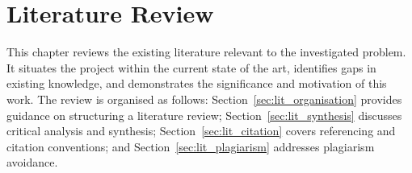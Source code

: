 
\chapter{Literature Review}
\label{ch:lit_rev}

This chapter reviews the existing literature relevant to the investigated problem. 
It situates the project within the current state of the art, identifies gaps in 
existing knowledge, and demonstrates the significance and motivation of this work. 
The review is organised as follows: Section~\ref{sec:lit_organisation} provides 
guidance on structuring a literature review; Section~\ref{sec:lit_synthesis} 
discusses critical analysis and synthesis; Section~\ref{sec:lit_citation} covers 
referencing and citation conventions; and Section~\ref{sec:lit_plagiarism} 
addresses plagiarism avoidance.


